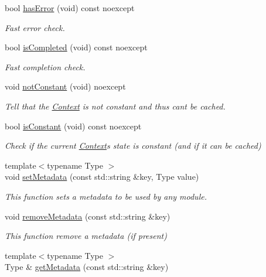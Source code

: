 \begin{DoxyCompactItemize}
bool \mbox{\hyperlink{classo_z_1_1_context_a53afdf1400b5ec8429b09da40662a34d}{has\+Error}} (void) const noexcept
\begin{DoxyCompactList}\small\item\em Fast error check. \end{DoxyCompactList}\item 
bool \mbox{\hyperlink{classo_z_1_1_context_ac5dd957a1f76f466b86a179ed3146967}{is\+Completed}} (void) const noexcept
\begin{DoxyCompactList}\small\item\em Fast completion check. \end{DoxyCompactList}\item 
void \mbox{\hyperlink{classo_z_1_1_context_ada521ec57fbc2febfd61177e8bbc0128}{not\+Constant}} (void) noexcept
\begin{DoxyCompactList}\small\item\em Tell that the \mbox{\hyperlink{classo_z_1_1_context}{Context}} is not constant and thus can\textquotesingle{}t be cached. \end{DoxyCompactList}\item 
bool \mbox{\hyperlink{classo_z_1_1_context_a748147258019436983fdbbf6ed51c0b6}{is\+Constant}} (void) const noexcept
\begin{DoxyCompactList}\small\item\em Check if the current \mbox{\hyperlink{classo_z_1_1_context}{Context}}\textquotesingle{}s state is constant (and if it can be cached) \end{DoxyCompactList}\item 
{\footnotesize template$<$typename Type $>$ }\\void \mbox{\hyperlink{classo_z_1_1_context_a7d5eb616d7daccab1f2cd8b3ae69c99c}{set\+Metadata}} (const std\+::string \&key, Type value)
\begin{DoxyCompactList}\small\item\em This function sets a metadata to be used by any module. \end{DoxyCompactList}\item 
void \mbox{\hyperlink{classo_z_1_1_context_a581fb3a0615050358b76f9216d3619e8}{remove\+Metadata}} (const std\+::string \&key)
\begin{DoxyCompactList}\small\item\em This function remove a metadata (if present) \end{DoxyCompactList}\item 
{\footnotesize template$<$typename Type $>$ }\\Type \& \mbox{\hyperlink{classo_z_1_1_context_aea81da5e7f1b69e87f16d660554a1e9c}{get\+Metadata}} (const std\+::string \&key)

\end{DoxyCompactItemize}
